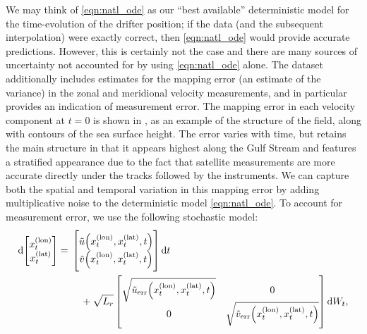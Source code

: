 We may think of \cref{eqn:natl_ode} as our ``best available'' deterministic model for the time-evolution of the drifter position; if the data (and the subsequent interpolation) were exactly correct, then \cref{eqn:natl_ode} would provide accurate predictions.
However, this is certainly not the case and there are many sources of uncertainty not accounted for by using \cref{eqn:natl_ode} alone.
The dataset additionally includes estimates for the mapping error (an estimate of the variance) in the zonal and meridional velocity measurements, and in particular provides an indication of measurement error. %
The mapping error in each velocity component at \(t = 0\) is shown in , as an example of the structure of the field, along with contours of the sea surface height.
The error varies with time, but retains the main structure in that it appears highest along the Gulf Stream and features a stratified appearance due to the fact that satellite measurements are more accurate directly under the tracks followed by the instruments.%
We can capture both the spatial and temporal variation in this mapping error by adding multiplicative noise to the deterministic model \cref{eqn:natl_ode}.
To account for measurement error, we use the following stochastic model:
\begin{equation}
	\dif \begin{bmatrix}
		x^{(\mathrm{lon})}_t \\ x^{(\mathrm{lat})}_t
	\end{bmatrix} = \begin{multlined}[t]
		\begin{bmatrix} \tilde{u}\!\left(x^{(\mathrm{lon})}_t, x^{(\mathrm{lat})}_t, t\right) \\ \tilde{v}\!\left(x^{(\mathrm{lon})}_t, x^{(\mathrm{lat})}_t, t\right) \end{bmatrix}\dif t \\
		+ \sqrt{L_r}\begin{bmatrix}
			\sqrt{\tilde{u}_{\mathrm{err}}\!\left(x^{(\mathrm{lon})}_t, x^{(\mathrm{lat})}_t, t\right)} & 0                                                                                           \\
			0                                                                                           & \sqrt{\tilde{v}_{\mathrm{err}}\!\left(x^{(\mathrm{lon})}_t, x^{(\mathrm{lat})}_t, t\right)}
		\end{bmatrix} \dif W_t,
	\end{multlined}
	\label{eqn:natl_sde}
\end{equation}
